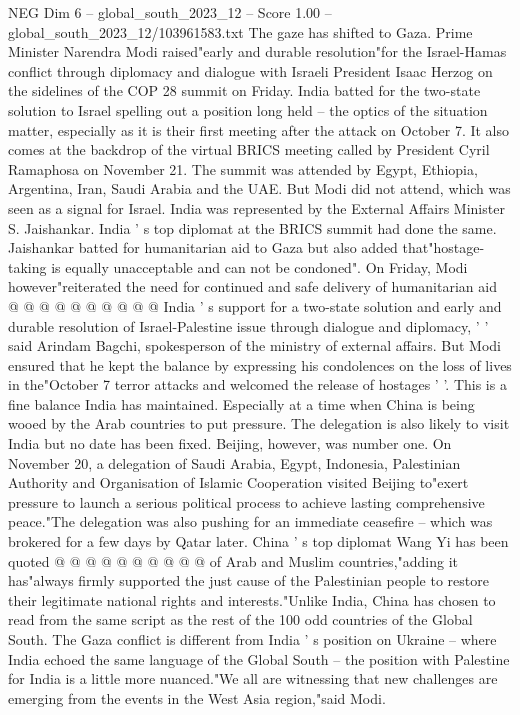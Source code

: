 \begin{textsample}{NEG Dim 6 – global\_south\_2023\_12 – Score 1.00 – global\_south\_2023\_12/103961583.txt}  \label{ex:f6_neg_324}
The gaze has shifted to Gaza.
Prime Minister Narendra Modi raised"early and durable resolution"for the Israel-Hamas conflict through diplomacy and dialogue with Israeli President Isaac Herzog on the sidelines of the COP 28 summit on Friday.
India batted for the two-state solution to Israel spelling out a position long held -- the optics of the situation matter, especially as it is their first meeting after the attack on October 7.
It also comes at the backdrop of the virtual BRICS meeting called by President Cyril Ramaphosa on November 21.
The summit was attended by Egypt, Ethiopia, Argentina, Iran, Saudi Arabia and the UAE.
But Modi did not attend, which was seen as a signal for Israel.
India was represented by the External Affairs Minister S.
Jaishankar.
India ' s top diplomat at the BRICS summit had done the same.
Jaishankar batted for humanitarian aid to Gaza but also added that"hostage-taking is equally unacceptable and can not be condoned".
On Friday, Modi however"reiterated the need for continued and safe delivery of humanitarian aid @ @ @ @ @ @ @ @ @ @ India ' s support for a two-state solution and early and durable resolution of Israel-Palestine issue through dialogue and diplomacy, ' ' said Arindam Bagchi, spokesperson of the ministry of external affairs.
But Modi ensured that he kept the balance by expressing his condolences on the loss of lives in the"October 7 terror attacks and welcomed the release of hostages ' '.
This is a fine balance India has maintained.
Especially at a time when China is being wooed by the Arab countries to put pressure.
The delegation is also likely to visit India but no date has been fixed.
Beijing, however, was number one.
On November 20, a delegation of Saudi Arabia, Egypt, Indonesia, Palestinian Authority and Organisation of Islamic Cooperation visited Beijing to"exert pressure to launch a serious political process to achieve lasting comprehensive peace."The delegation was also pushing for an immediate ceasefire -- which was brokered for a few days by Qatar later.
China ' s top diplomat Wang Yi has been quoted @ @ @ @ @ @ @ @ @ @ of Arab and Muslim countries,"adding it has"always firmly supported the just cause of the Palestinian people to restore their legitimate national rights and interests."Unlike India, China has chosen to read from the same script as the rest of the 100 odd countries of the Global South.
The Gaza conflict is different from India ' s position on Ukraine -- where India echoed the same language of the Global South -- the position with Palestine for India is a little more nuanced."We all are witnessing that new challenges are emerging from the events in the West Asia region,"said Modi.

\end{textsample}
